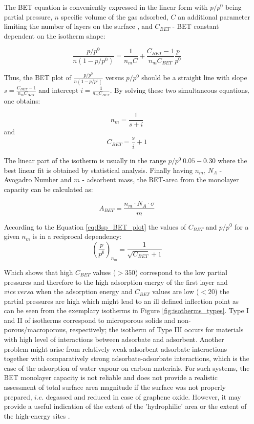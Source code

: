 The BET equation is conveniently expressed in the linear form with $p/p^0$ being partial pressure, $n$ specific volume of the gas adsorbed, $C$ an additional parameter limiting the number of layers on the surface \cite{noauthor_adsorption_nodate}, and $C_{BET}$ - BET constant dependent on the isotherm shape: 

\begin{equation}
\frac{p/p^0}{n(1-p/p^0)}=\frac{1}{n_mC} + \frac{C_{BET}-1}{n_mC_{BET}}\frac{p}{p^0}
  \label{eq:Bsp_BET_plot}
\end{equation}

Thus, the BET plot of \( \frac{p/p^0}{n(1-p/p^0)} \) versus \(p/p^0\) should be a straight line with slope \(s = \frac{C_{BET}- 1}{n_m C_{BET}} \) and intercept \( i = \frac{1}{n_m C_{BET}} \). By solving these two simultaneous equations, one obtains: 

\begin{equation}
    n_m = \frac{1}{s + i}
\end{equation}
and
\begin{equation}
    C_{BET} = \frac{s}{i} + 1
\end{equation}

The linear part of the isotherm is usually in the range  \(p/p^0 ~ 0.05-0.30 \) where the best linear fit is obtained by statistical analysis. Finally having $n_m$, $N_A$ - Avogadro Number and $m$ - adsorbent mass, the BET-area from the monolayer capacity can be calculated as:

\begin{equation}
    A_{BET} = \frac{n_m \cdot N_A \cdot \sigma}{m}
\end{equation}

According to the Equation \ref{eq:Bsp_BET_plot} the values of $C_{BET}$  and \(p/p^0\) for a given $n_m$ is in a reciprocal dependency:
\begin{equation}
    \left(\frac{p}{p^0}\right)_{n_m}=\frac{1}{\sqrt{C_{BET}}+1}
\end{equation}

Which shows that high $C_{BET}$ values ($>350$) correspond to the low partial pressures and therefore to the high adsorption energy of the first layer and $vice\:versa$ when the adsorption energy and $C_{BET}$ values are low ($ < 20$) the partial pressures are high which might lead to an ill defined inflection point \cite{ROUQUEROL1999165} as can be seen from the exemplary isotherms in Figure \ref{fig:isotherms_types}. Type I and II of isotherms correspond to microporous solids and non-porous/macroporous,  respectively; the isotherm of Type III occurs for materials with high level of interactions between adsorbate and adsorbent. Another problem might arise from relatively weak adsorbent-adsorbate interactions together with comparatively strong adsorbate-adsorbate interactions, which is the case of the adsorption of water vapour on carbon materials.  For such systems, the BET monolayer capacity is not reliable and does not provide a realistic assessment of total surface area magnitude if the surface was not properly prepared, $i.e.$ degassed and reduced in case of graphene oxide. However, it may provide a useful indication of the extent of the 'hydrophilic' area or the extent of the high-energy sites \cite{ROUQUEROL1999237}. 

